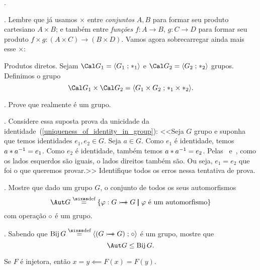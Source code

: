 \endsection

\problems.

\blah.
Lembre que já usamos $\times$ entre \emph{conjuntos} $A,B$ para formar seu
produto cartesiano $A \times B$; e também entre \emph{funções} $f : A \to B$,
$g : C \to D$ para formar seu produto
$f \times g : (A\times C) \to (B \times D)$.
Vamos agora sobrecarregar ainda mais esse $\times$:

 Produtos diretos.
Sejam $\cal G_1 = \sset {G_1} {\ast_1}$ e $\cal G_2 = \sset {G_2} {\ast_2}$ grupos.
Definimos o grupo
$$
\cal G_1 \times \cal G_2 = \sset {G_1 \times G_2} {{\ast_1} \times {\ast_2}}.
$$

\problem.
Prove que realmente é um grupo.

\endproblem

\problem.
\label{bust_proof_of_uniqueness_of_identity_in_group}%
Considere essa suposta prova da unicidade da identidade~(\ref{uniqueness_of_identity_in_group}):
\endgraf
<<Seja $G$ grupo e suponha que temos identidades $e_1,e_2 \in G$.
Seja $a\in G$.
Como $e_1$ é identidade, temos $a \ast {a}^{-1} = e_1$.
Como $e_2$ é identidade, também temos $a \ast {a}^{-1} = e_2$.
Pelas ~e~, como os lados esquerdos são iguais,
o lados direitos também são.
Ou seja, $e_1 = e_2$ que foi o que queremos provar.>>
\endgraf
Identifique todos os erros nessa tentativa de prova.

\endproblem

\problem.
\label{aut_G_is_a_group}%
Mostre que dado um grupo $G$, o conjunto de todos os seus automorfismos
$$
\Aut G
\defeq
\set{
\phi : G\bijto G
\st
\text{$\phi$ é um automorfismo}
}
$$
com operação $\circ$ é um grupo.

\endproblem

\problem.
\label{aut_G_subgrp_bij_G}%
Sabendo que $\namedop{Bij} G \defeq \sset {(G \bijto G)} {\compose}$ é um grupo,
mostre que
$$
\Aut G \subgroup \namedop{Bij} G.
$$

\hint
Se $F$ é injetora, então $x=y \impliedby F(x) = F(y)$.

